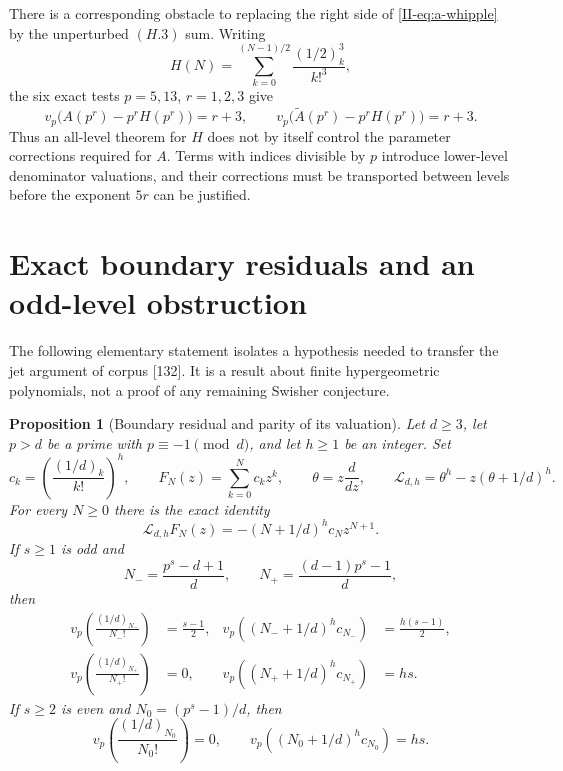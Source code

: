 \documentclass[11pt,letterpaper]{article}
\newtheorem{proposition}[theorem]{Proposition}
\numberwithin{equation}{section}
\begin{document}
There is a corresponding obstacle to replacing the right side of
\eqref{II-eq:a-whipple} by the unperturbed $(H.3)$ sum. Writing
\[
 H(N)=\sum_{k=0}^{(N-1)/2}\frac{(1/2)_k^3}{k!^3},
\]
the six exact tests $p=5,13$, $r=1,2,3$ give
\[
 v_p\bigl(A(p^r)-p^rH(p^r)\bigr)=r+3,
 \qquad
 v_p\bigl(\widetilde A(p^r)-p^rH(p^r)\bigr)=r+3.
\]
Thus an all-level theorem for $H$ does not by itself control the
parameter corrections required for $A$. Terms with indices divisible
by $p$ introduce lower-level denominator valuations, and their
corrections must be transported between levels before the exponent
$5r$ can be justified.

\section{Exact boundary residuals and an odd-level obstruction}\label{loc-II-9}\label{II-sec:parity-location}

The following elementary statement isolates a hypothesis needed to transfer
the jet argument of corpus [132]. It is a result about finite hypergeometric
polynomials, not a proof of any remaining Swisher conjecture.

\begin{proposition}[Boundary residual and parity of its valuation]
Let $d\geq3$, let $p>d$ be a prime with $p\equiv-1\pmod d$, and let
$h\geq1$ be an integer. Set
\[
 c_k=\left(\frac{(1/d)_k}{k!}\right)^h,\qquad
 F_N(z)=\sum_{k=0}^{N}c_kz^k,\qquad
 \theta=z\frac{d}{dz},\qquad
 \mathcal L_{d,h}=\theta^h-z(\theta+1/d)^h.
\]
For every $N\geq0$ there is the exact identity
\begin{equation}\label{II-eq:boundary-general}
 \mathcal L_{d,h}F_N(z)
   =-(N+1/d)^h c_Nz^{N+1}.
\end{equation}
If $s\geq1$ is odd and
\[
 N_- = \frac{p^s-d+1}{d},\qquad
 N_+ = \frac{(d-1)p^s-1}{d},
\]
then
\begin{align}
 v_p\!\left(\frac{(1/d)_{N_-}}{N_-!}\right)&=\frac{s-1}{2},
 &v_p\!\left((N_-+1/d)^h c_{N_-}\right)&=\frac{h(s-1)}2,
 \label{II-eq:short-valuation}\\
 v_p\!\left(\frac{(1/d)_{N_+}}{N_+!}\right)&=0,
 &v_p\!\left((N_++1/d)^h c_{N_+}\right)&=hs.
 \label{II-eq:long-valuation}
\end{align}
If $s\geq2$ is even and $N_0=(p^s-1)/d$, then
\begin{equation}\label{II-eq:even-valuation}
 v_p\!\left(\frac{(1/d)_{N_0}}{N_0!}\right)=0,
 \qquad
 v_p\!\left((N_0+1/d)^h c_{N_0}\right)=hs.
\end{equation}
\end{proposition}
\end{document}
